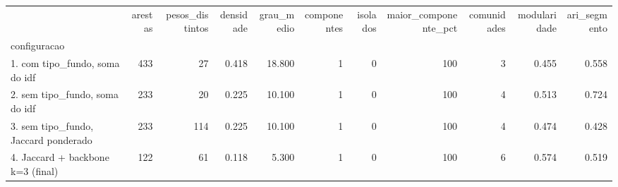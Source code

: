 \begin{tabular}{lrrrrrrrrrr}
\toprule
 & arestas & pesos\_distintos & densidade & grau\_medio & componentes & isolados & maior\_componente\_pct & comunidades & modularidade & ari\_segmento \\
configuracao &  &  &  &  &  &  &  &  &  &  \\
\midrule
1. com tipo\_fundo, soma do idf & 433 & 27 & 0.418 & 18.800 & 1 & 0 & 100 & 3 & 0.455 & 0.558 \\
2. sem tipo\_fundo, soma do idf & 233 & 20 & 0.225 & 10.100 & 1 & 0 & 100 & 4 & 0.513 & 0.724 \\
3. sem tipo\_fundo, Jaccard ponderado & 233 & 114 & 0.225 & 10.100 & 1 & 0 & 100 & 4 & 0.474 & 0.428 \\
4. Jaccard + backbone k=3 (final) & 122 & 61 & 0.118 & 5.300 & 1 & 0 & 100 & 6 & 0.574 & 0.519 \\
\bottomrule
\end{tabular}
